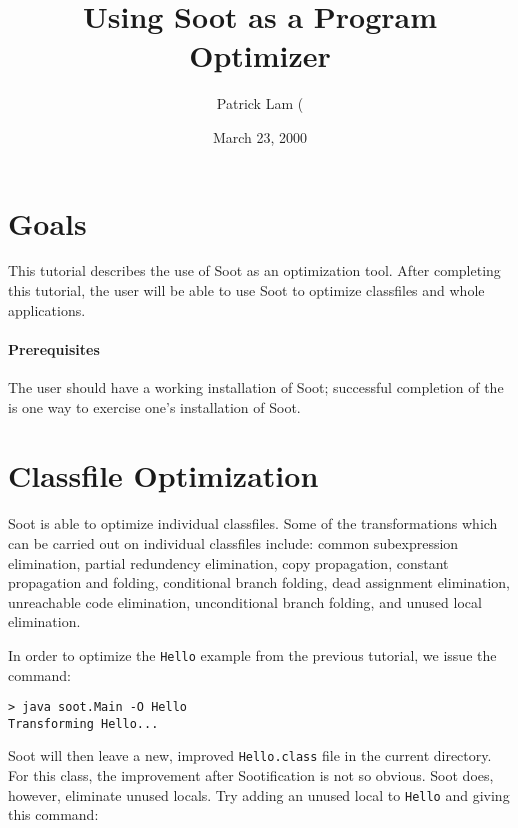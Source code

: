 \documentclass{article}
\title{Using Soot as a Program Optimizer}
\author{Patrick Lam (\htmladdnormallink{plam@sable.mcgill.ca)}{mailto:plam@sable.mcgill.ca}}
\date{March 23, 2000}
\begin{document}
\maketitle

\section{Goals}

This tutorial describes the use of Soot as an optimization tool.  
After completing this tutorial, the user will be able to use Soot
to optimize classfiles and whole applications.

\paragraph{Prerequisites} The user should have a working installation
of Soot; successful completion of the 
is one way to exercise one's installation of Soot.

\section{Classfile Optimization}

Soot is able to optimize individual classfiles.  Some of the transformations
which can be carried out on individual classfiles include:
common subexpression elimination, partial redundency elimination, 
copy propagation, constant propagation and folding, conditional
branch folding, dead assignment elimination, unreachable code elimination,
unconditional branch folding, and unused local
elimination.


In order to optimize the {\tt Hello} example from the previous tutorial,
we issue the command:

\begin{verbatim}
> java soot.Main -O Hello
Transforming Hello...
\end{verbatim}

Soot will then leave a new, improved {\tt Hello.class} file in the
current directory.  For this class, the improvement after
Sootification is not so obvious.  Soot does, however, eliminate unused
locals.  Try adding an unused local to {\tt Hello} and giving this command:
\end{document}
